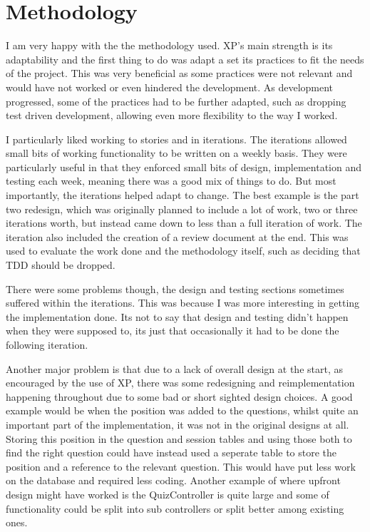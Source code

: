 \section{Methodology}
I am very happy with the the methodology used. XP's main strength is its adaptability and the first thing to do was adapt a set its practices to fit the needs of the project. This was very beneficial as some practices were not relevant and would have not worked or even hindered the development. As development progressed, some of the practices had to be further adapted, such as dropping test driven development, allowing even more flexibility to the way I worked.

I particularly liked working to stories and in iterations. The iterations allowed small bits of working functionality to be written on a weekly basis. They were particularly useful in that they enforced small bits of design, implementation and testing each week, meaning there was a good mix of things to do. But most importantly, the iterations helped adapt to change. The best example is the part two redesign, which was originally planned to include a lot of work, two or three iterations worth, but instead came down to less than a full iteration of work. The iteration also included the creation of a review document at the end. This was used to evaluate the work done and the methodology itself, such as deciding that TDD should be dropped.

There were some problems though, the design and testing sections sometimes suffered within the iterations. This was because I was more interesting in getting the implementation done. Its not to say that design and testing didn't happen when they were supposed to, its just that occasionally it had to be done the following iteration.

Another major problem is that due to a lack of overall design at the start, as encouraged by the use of XP, there was some redesigning and reimplementation happening throughout due to some bad or short sighted design choices. A good example would be when the position was added to the questions, whilst quite an important part of the implementation, it was not in the original designs at all. Storing this position in the question and session tables and using those both to find the right question could have instead used a seperate table to store the position and a reference to the relevant question. This would have put less work on the database and required less coding. Another example of where upfront design might have worked is the QuizController is quite large and some of functionality could be split into sub controllers or split better among existing ones.

